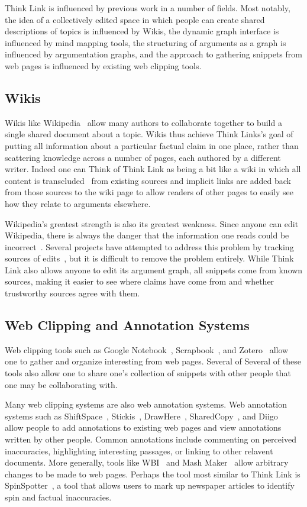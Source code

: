 \documentclass{chi2009}
\begin{document}
Think Link is influenced by previous work in a number of fields. Most notably, the idea of a collectively edited space in which people can create shared descriptions of topics is influenced by Wikis, the dynamic graph interface is influenced by mind mapping tools, the structuring of arguments as a graph is influenced by argumentation graphs, and the approach to gathering snippets from web pages is influenced by existing web clipping tools.

\subsection{Wikis}

Wikis like Wikipedia~\cite{wikipedia} allow many authors to collaborate together to build a single shared document about a topic. Wikis thus achieve Think Links's goal of putting all information about a particular factual claim in one place, rather than scattering knowledge across a number of pages, each authored by a different writer. Indeed one can Think of Think Link as being a bit like a wiki in which all content is transcluded~\cite{transclusion} from existing sources and implicit links are added back from those sources to the wiki page to allow readers of other pages to easily see how they relate to arguments elsewhere.

Wikipedia's greatest strength is also its greatest weakness. Since anyone can edit Wikipedia, there is always the danger that the information one reads could be incorrect~\cite{wikifalse}. Several projects have attempted to address this problem by tracking sources of edits~\cite{wikicorrect}, but it is difficult to remove the problem entirely. While Think Link also allows anyone to edit its argument graph, all snippets come from known sources, making it easier to see where claims have come from and whether trustworthy sources agree with them.

\subsection{Web Clipping and Annotation Systems}

Web clipping tools such as Google Notebook~\cite{googlenotebook}, Scrapbook~\cite{scrapbook}, and Zotero~\cite{zotero} allow one to gather and organize interesting from web pages. Several of Several of these tools also allow one to share one's collection of snippets with other people that one may be collaborating with. 

Many web clipping systems are also web annotation systems. Web annotation systems such as ShiftSpace~\cite{shiftspace}, Stickis~\cite{stickis}, DrawHere~\cite{drawhere}, SharedCopy~\cite{sharedcopy}, and Diigo~\cite{diigo} allow people to add annotations to existing web pages and view annotations written by other people. Common annotations include commenting on perceived inaccuracies, highlighting interesting passages, or linking to other relavent documents. More generally, tools like WBI~\cite{personalweb} and Mash Maker~\cite{mashmaker} allow arbitrary changes to be made to web pages. Perhaps the tool most similar to Think Link is SpinSpotter~\cite{spinspotter}, a tool that allows users to mark up newspaper articles to identify spin and factual inaccuracies.
\end{document}
